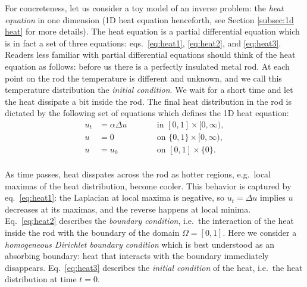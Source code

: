 
For concreteness, let us consider a toy model of an inverse problem:
the \emph{heat equation} in one dimension (1D heat equation
henceforth, see Section \ref{subsec:1d heat} for more details). The
heat equation is a partial differential equation which is in fact a
set of three equations: eqs.~\eqref{eq:heat1}, \eqref{eq:heat2}, and
\eqref{eq:heat3}. Readers less familiar with partial differential
equations should think of the heat equation as follows: before us
there is a perfectly insulated metal rod. At each point on the rod the
temperature is different and unknown, and we call this temperature
distribution the \emph{initial condition}. We wait for a short time
and let the heat dissipate a bit inside the rod. The final heat
distribution in the rod is dictated by the following set of equations
which defines the 1D heat equation:
\begin{subequations}%
  \begin{alignat}{2}
    u_t &= \alpha \Delta u &&\qquad \text{in } [0,1] \times [0,\infty), \label{eq:heat1}\\
    u &= 0 &&\qquad \text{on } \{0, 1\} \times [0,\infty), \label{eq:heat2}\\
    u &= u_0 &&\qquad \text{on }[0,1] \times \{0\}. \label{eq:heat3}\\
  \end{alignat}
\end{subequations}

As time passes, heat disspates across the rod as hotter regions,
e.g.~local maximas of the heat distribution, become cooler. This
behavior is captured by eq.~\eqref{eq:heat1}: the Laplacian at local
maxima is negative, so $u_t = \Delta u$ implies $u$ decreases at its
maximas, and the reverse happens at local minima. Eq.~\eqref{eq:heat2}
describes the \emph{boundary condition}, i.e.~the interaction of the
heat inside the rod with the boundary of the domain $\Omega =
[0,1]$. Here we consider a \emph{homogeneous Dirichlet boundary
condition} which is best understood as an absorbing boundary: heat
that interacts with the boundary immediately
disappears. Eq.~\eqref{eq:heat3} describes the \emph{initial
condition} of the heat, i.e.~the heat distribution at time $t=0$.


